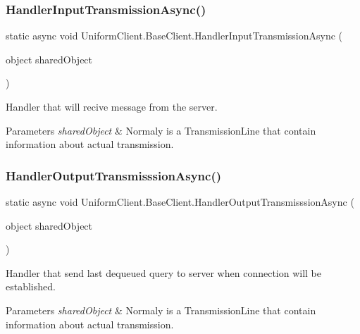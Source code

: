 \subsubsection{\texorpdfstring{Handler\+Input\+Transmission\+Async()}{HandlerInputTransmissionAsync()}}
{\footnotesize\ttfamily static async void Uniform\+Client.\+Base\+Client.\+Handler\+Input\+Transmission\+Async (\begin{DoxyParamCaption}\item[{object}]{shared\+Object }\end{DoxyParamCaption})\hspace{0.3cm}{\ttfamily [static]}}



Handler that will recive message from the server. 


\begin{DoxyParams}{Parameters}
{\em shared\+Object} & Normaly is a Transmission\+Line that contain information about actual transmission.\\
\hline
\end{DoxyParams}
\mbox{\label{class_uniform_client_1_1_base_client_a233b9fc7f1cdc4df399115938afd917d}} 
\subsubsection{\texorpdfstring{Handler\+Output\+Transmisssion\+Async()}{HandlerOutputTransmisssionAsync()}}
{\footnotesize\ttfamily static async void Uniform\+Client.\+Base\+Client.\+Handler\+Output\+Transmisssion\+Async (\begin{DoxyParamCaption}\item[{object}]{shared\+Object }\end{DoxyParamCaption})\hspace{0.3cm}{\ttfamily [static]}}



Handler that send last dequeued query to server when connection will be established. 


\begin{DoxyParams}{Parameters}
{\em shared\+Object} & Normaly is a Transmission\+Line that contain information about actual transmission.\\
\hline
\end{DoxyParams}
\mbox{\label{class_uniform_client_1_1_base_client_a8abbd1d46cc50556eeae8bbd55ce680f}} 
